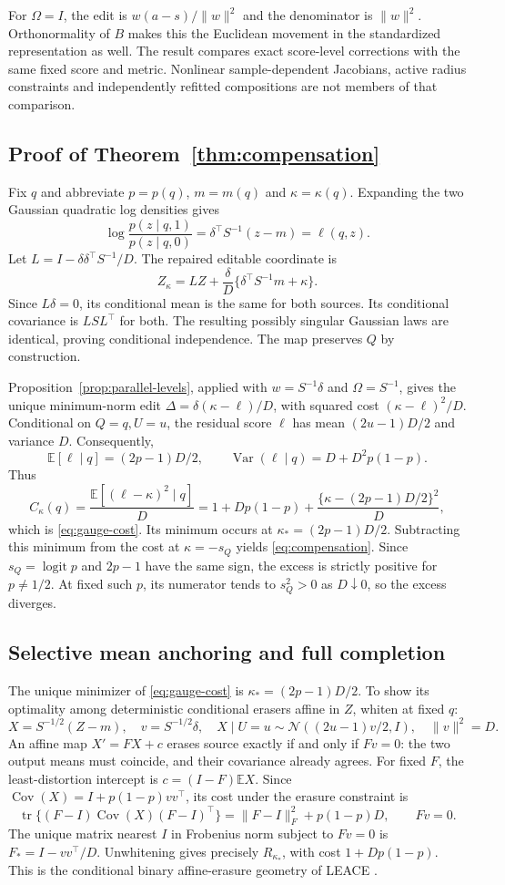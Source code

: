 \documentclass{article}
\theoremstyle{plain}
\theoremstyle{definition}
\newcommand{\E}{\mathbb E}
\newcommand{\sg}{s_Q}
\DeclareMathOperator{\logit}{logit}
\DeclareMathOperator{\Cov}{Cov}
\DeclareMathOperator{\Var}{Var}
\DeclareMathOperator{\tr}{tr}
\begin{document}
For $\Omega=I$, the edit is $w(a-s)/\|w\|^2$ and the denominator is
$\|w\|^2$. Orthonormality of $B$ makes this the Euclidean movement in
the standardized representation as well. The result compares exact
score-level corrections with the same fixed score and metric. Nonlinear
sample-dependent Jacobians, active radius constraints and independently
refitted compositions are not members of that comparison.

\subsection{Proof of Theorem~\ref{thm:compensation}}
\label{app:gaussian-proof}
Fix $q$ and abbreviate $p=p(q)$, $m=m(q)$ and $\kappa=\kappa(q)$.
Expanding the two Gaussian quadratic log densities gives
\[
 \log\frac{p(z\mid q,1)}{p(z\mid q,0)}
 =\delta^\top S^{-1}(z-m)=\ell(q,z).
\]
Let $L=I-\delta\delta^\top S^{-1}/D$. The repaired editable coordinate is
\[
 Z_\kappa=LZ+\frac{\delta}{D}
                  \{\delta^\top S^{-1}m+\kappa\}.
\]
Since $L\delta=0$, its conditional mean is the same for both sources.
Its conditional covariance is $LSL^\top$ for both. The resulting possibly
singular Gaussian laws are identical, proving conditional independence.
The map preserves $Q$ by construction.

Proposition~\ref{prop:parallel-levels}, applied with $w=S^{-1}\delta$ and
$\Omega=S^{-1}$, gives the unique minimum-norm edit
$\Delta=\delta(\kappa-\ell)/D$, with squared cost $(\kappa-\ell)^2/D$.
Conditional on $Q=q,U=u$, the residual score $\ell$ has mean
$(2u-1)D/2$ and variance $D$. Consequently,
\[
 \E[\ell\mid q]=(2p-1)D/2,\qquad
 \Var(\ell\mid q)=D+D^2p(1-p).
\]
Thus
\[
 C_\kappa(q)=\frac{\E[(\ell-\kappa)^2\mid q]}{D}
 =1+Dp(1-p)+\frac{\{\kappa-(2p-1)D/2\}^2}{D},
\]
which is \eqref{eq:gauge-cost}. Its minimum occurs at
$\kappa_*=(2p-1)D/2$. Subtracting this minimum from the cost at
$\kappa=-\sg$ yields \eqref{eq:compensation}. Since $\sg=\logit p$ and
$2p-1$ have the same sign, the excess is strictly positive for $p\ne1/2$.
At fixed such $p$, its numerator tends to $\sg^2>0$ as $D\downarrow0$,
so the excess diverges.

\subsection{Selective mean anchoring and full completion}
\label{app:completion}
The unique minimizer of \eqref{eq:gauge-cost} is
$\kappa_*=(2p-1)D/2$. To show its optimality among deterministic conditional
erasers affine in $Z$, whiten at fixed $q$:
\[
 X=S^{-1/2}(Z-m),\quad v=S^{-1/2}\delta,\quad
 X\mid U=u\sim\mathcal N((2u-1)v/2,I),\quad\|v\|^2=D.
\]
An affine map $X'=FX+c$ erases source exactly if and only if $Fv=0$:
the two output means must coincide, and their covariance already agrees.
For fixed $F$, the least-distortion intercept is $c=(I-F)\E X$. Since
$\Cov(X)=I+p(1-p)vv^\top$, its cost under the erasure constraint is
\[
 \tr\{(F-I)\Cov(X)(F-I)^\top\}
 =\|F-I\|_F^2+p(1-p)D,\qquad Fv=0.
\]
The unique matrix nearest $I$ in Frobenius norm subject to $Fv=0$ is
$F_*=I-vv^\top/D$. Unwhitening gives precisely $R_{\kappa_*}$, with
cost $1+Dp(1-p)$. This is the conditional binary affine-erasure geometry
of LEACE \citep{belrose2023}.
\end{document}
